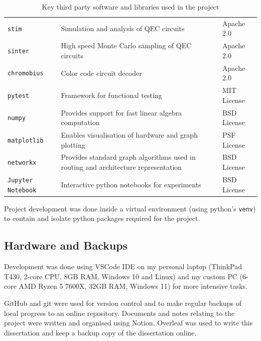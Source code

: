 \begin{table}[!h]
\centering
\renewcommand{\arraystretch}{1.2}
\begin{tabular}{|>{\raggedright\arraybackslash}p{2.5cm}|>{\raggedright\arraybackslash}p{8cm}|>{\raggedright\arraybackslash}p{2.5cm}|}
\hline
\multicolumn{1}{|c|}{\textbf{Library}} & 
\multicolumn{1}{c|}{\textbf{Purpose}} & 
\multicolumn{1}{c|}{\textbf{License}} \\
\hline

\texttt{stim}
& Simulation and analysis of QEC circuits
& Apache 2.0 \\


\texttt{sinter}
& High speed Monte Carlo sampling of QEC circuits
& Apache 2.0 \\

\texttt{chromobius}
& Color code circuit decoder
& Apache 2.0\\

\texttt{pytest}
& Framework for functional testing 
& MIT License \\

\texttt{numpy}
& Provides support for fast linear algebra computation
& BSD License \\

\texttt{matplotlib}
& Enables visualisation of hardware and graph plotting
& PSF License \\

\texttt{networkx}
& Provides standard graph algorithms used in routing and architecture representation
& BSD License \\

\texttt{Jupyter} \texttt{Notebook}
& Interactive python notebooks for experiments
& BSD License \\
\hline

\end{tabular}
\caption{Key third party software and libraries used in the project}
\label{tab:licenses}
\end{table}

Project development was done inside a virtual environment (using python's \texttt{venv}) to contain and isolate python packages required for the project.

\subsection{Hardware and Backups}

Development was done using VSCode IDE on my personal laptop (ThinkPad T430, 2-core CPU, 8GB RAM, Windows 10 and Linux) and my custom PC (6-core AMD Ryzen 5 7600X, 32GB RAM, Windows 11) for more intensive tasks. 

GitHub and git were used for version control and to make regular backups of local progress to an online repository. 
Documents and notes relating to the project were written and organised using Notion. Overleaf was used to write this dissertation and keep a backup copy of the dissertation online.


